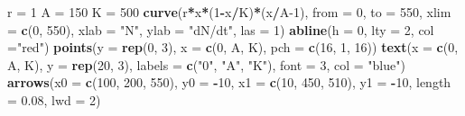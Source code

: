 \documentclass[
]{book}
\newenvironment{Shaded}{\begin{snugshade}}{\end{snugshade}}
\newcommand{\AttributeTok}[1]{\textcolor[rgb]{0.13,0.29,0.53}{#1}}
\newcommand{\DecValTok}[1]{\textcolor[rgb]{0.00,0.00,0.81}{#1}}
\newcommand{\FloatTok}[1]{\textcolor[rgb]{0.00,0.00,0.81}{#1}}
\newcommand{\FunctionTok}[1]{\textcolor[rgb]{0.13,0.29,0.53}{\textbf{#1}}}
\newcommand{\NormalTok}[1]{#1}
\newcommand{\OtherTok}[1]{\textcolor[rgb]{0.56,0.35,0.01}{#1}}
\newcommand{\SpecialCharTok}[1]{\textcolor[rgb]{0.81,0.36,0.00}{\textbf{#1}}}
\newcommand{\StringTok}[1]{\textcolor[rgb]{0.31,0.60,0.02}{#1}}
\begin{document}
\begin{Shaded}
\begin{Highlighting}[]
\NormalTok{r }\OtherTok{=} \DecValTok{1}
\NormalTok{A }\OtherTok{=} \DecValTok{150}
\NormalTok{K }\OtherTok{=} \DecValTok{500}
\FunctionTok{curve}\NormalTok{(r}\SpecialCharTok{*}\NormalTok{x}\SpecialCharTok{*}\NormalTok{(}\DecValTok{1}\SpecialCharTok{{-}}\NormalTok{x}\SpecialCharTok{/}\NormalTok{K)}\SpecialCharTok{*}\NormalTok{(x}\SpecialCharTok{/}\NormalTok{A}\DecValTok{{-}1}\NormalTok{), }\AttributeTok{from =} \DecValTok{0}\NormalTok{, }\AttributeTok{to =} \DecValTok{550}\NormalTok{, }\AttributeTok{xlim =} \FunctionTok{c}\NormalTok{(}\DecValTok{0}\NormalTok{, }\DecValTok{550}\NormalTok{),}
      \AttributeTok{xlab =} \StringTok{"N"}\NormalTok{, }\AttributeTok{ylab =} \StringTok{"dN/dt"}\NormalTok{, }\AttributeTok{las =} \DecValTok{1}\NormalTok{)}
\FunctionTok{abline}\NormalTok{(}\AttributeTok{h =} \DecValTok{0}\NormalTok{, }\AttributeTok{lty =} \DecValTok{2}\NormalTok{, }\AttributeTok{col =}\StringTok{"red"}\NormalTok{)}
\FunctionTok{points}\NormalTok{(}\AttributeTok{y =} \FunctionTok{rep}\NormalTok{(}\DecValTok{0}\NormalTok{, }\DecValTok{3}\NormalTok{), }\AttributeTok{x =} \FunctionTok{c}\NormalTok{(}\DecValTok{0}\NormalTok{, A, K), }\AttributeTok{pch =} \FunctionTok{c}\NormalTok{(}\DecValTok{16}\NormalTok{, }\DecValTok{1}\NormalTok{, }\DecValTok{16}\NormalTok{))}
\FunctionTok{text}\NormalTok{(}\AttributeTok{x =} \FunctionTok{c}\NormalTok{(}\DecValTok{0}\NormalTok{, A, K), }\AttributeTok{y =} \FunctionTok{rep}\NormalTok{(}\DecValTok{20}\NormalTok{, }\DecValTok{3}\NormalTok{), }\AttributeTok{labels =} \FunctionTok{c}\NormalTok{(}\StringTok{"0"}\NormalTok{, }\StringTok{"A"}\NormalTok{, }\StringTok{"K"}\NormalTok{), }\AttributeTok{font =} \DecValTok{3}\NormalTok{, }\AttributeTok{col =} \StringTok{"blue"}\NormalTok{)}
\FunctionTok{arrows}\NormalTok{(}\AttributeTok{x0 =} \FunctionTok{c}\NormalTok{(}\DecValTok{100}\NormalTok{, }\DecValTok{200}\NormalTok{, }\DecValTok{550}\NormalTok{), }\AttributeTok{y0 =} \SpecialCharTok{{-}}\DecValTok{10}\NormalTok{, }\AttributeTok{x1 =} \FunctionTok{c}\NormalTok{(}\DecValTok{10}\NormalTok{, }\DecValTok{450}\NormalTok{, }\DecValTok{510}\NormalTok{), }\AttributeTok{y1 =} \SpecialCharTok{{-}}\DecValTok{10}\NormalTok{, }\AttributeTok{length =} \FloatTok{0.08}\NormalTok{, }\AttributeTok{lwd =} \DecValTok{2}\NormalTok{)}
\end{Highlighting}
\end{Shaded}
\end{document}
